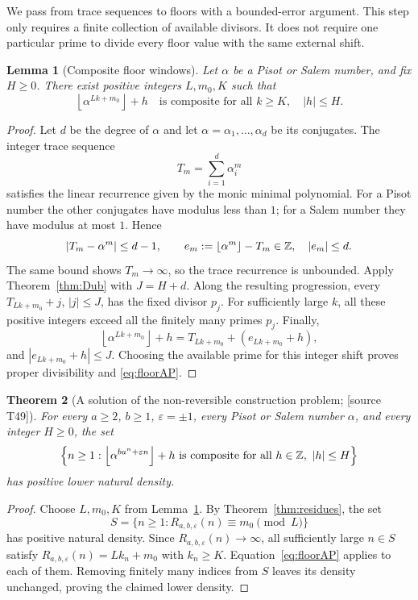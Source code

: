 \documentclass[11pt,a4paper]{article}
\newtheorem{theorem}{Theorem}[section]
\newtheorem{lemma}[theorem]{Lemma}
\theoremstyle{definition}\newtheorem{definition}[theorem]{Definition}
\theoremstyle{remark}\newtheorem{remark}[theorem]{Remark}
\newcommand{\floor}[1]{\left\lfloor #1\right\rfloor}\newcommand{\ceil}[1]{\left\lceil #1\right\rceil}
\newcommand{\sourceT}[1]{\textup{[source T#1]}}
\begin{document}
We pass from trace sequences to floors with a bounded-error argument.
This step only requires a finite collection of available divisors.
It does not require one particular prime to divide every floor value
with the same external shift.

\begin{lemma}[Composite floor windows]\label{lem:floorAP}
Let $\alpha$ be a Pisot or Salem number, and fix $H\ge0$. There
exist positive integers $L,m_0,K$ such that
\begin{equation}\label{eq:floorAP}
 \floor{\alpha^{Lk+m_0}}+h
 \quad\text{is composite for all }k\ge K,\quad |h|\le H.
\end{equation}
\end{lemma}
\begin{proof}
Let $d$ be the degree of $\alpha$ and let
$\alpha=\alpha_1,\ldots,\alpha_d$ be its conjugates. The integer
trace sequence
\[
 T_m=\sum_{i=1}^d\alpha_i^m
\]
satisfies the linear recurrence given by the monic minimal polynomial.
For a Pisot number the other conjugates have modulus less than $1$;
for a Salem number they have modulus at most $1$. Hence
\[
 |T_m-\alpha^m|\le d-1,\qquad
 e_m:=\floor{\alpha^m}-T_m\in\Z,\quad |e_m|\le d.
\]
The same bound shows $T_m\to\infty$, so the trace recurrence is
unbounded. Apply Theorem~\ref{thm:Dub} with $J=H+d$. Along the
resulting progression, every $T_{Lk+m_0}+j$, $|j|\le J$, has the
fixed divisor $p_j$. For sufficiently large $k$, all these positive
integers exceed all the finitely many primes $p_j$. Finally,
\[
 \floor{\alpha^{Lk+m_0}}+h
 =T_{Lk+m_0}+(e_{Lk+m_0}+h),
\]
and $|e_{Lk+m_0}+h|\le J$. Choosing the available prime for this
integer shift proves proper divisibility and \eqref{eq:floorAP}.
\end{proof}

\begin{theorem}[A solution of the non-reversible construction problem;
\sourceT{49}]\label{thm:composite}
For every $a\ge2$, $b\ge1$, $\varepsilon=\pm1$, every Pisot or
Salem number $\alpha$, and every integer $H\ge0$, the set
\[
 \left\{n\ge1:
 \floor{\alpha^{ba^n+\varepsilon n}}+h\text{ is composite for all }
 h\in\Z,\ |h|\le H\right\}
\]
has positive lower natural density.
\end{theorem}
\begin{proof}
Choose $L,m_0,K$ from Lemma~\ref{lem:floorAP}. By
Theorem~\ref{thm:residues}, the set
\[
 S=\{n\ge1:R_{a,b,\varepsilon}(n)\equiv m_0\pmod L\}
\]
has positive natural density. Since $R_{a,b,\varepsilon}(n)\to\infty$,
all sufficiently large $n\in S$ satisfy
$R_{a,b,\varepsilon}(n)=Lk_n+m_0$ with $k_n\ge K$.
Equation~\eqref{eq:floorAP} applies to each of them. Removing finitely
many indices from $S$ leaves its density unchanged, proving the
claimed lower density.
\end{proof}
\end{document}
